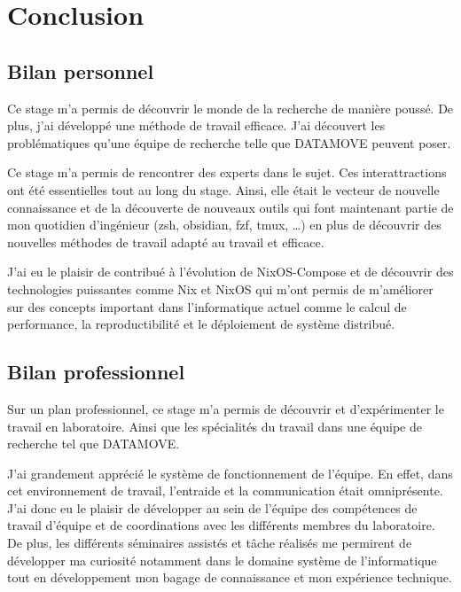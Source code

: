 \documentclass[a4paper,french,12pt, titlepage]{article}
\begin{document}
\newpage

\hypertarget{conclusion}{%
\section{Conclusion}\label{conclusion}}

\hypertarget{bilan-personnel}{%
\subsection{Bilan personnel}\label{bilan-personnel}}

Ce stage m'a permis de découvrir le monde de la recherche de manière
poussé. De plus, j'ai développé une méthode de travail efficace. J'ai
découvert les problématiques qu'une équipe de recherche telle que
DATAMOVE peuvent poser.

Ce stage m'a permis de rencontrer des experts dans le sujet. Ces
interattractions ont été essentielles tout au long du stage. Ainsi, elle
était le vecteur de nouvelle connaissance et de la découverte de
nouveaux outils qui font maintenant partie de mon quotidien d'ingénieur
(zsh, obsidian, fzf, tmux, \ldots) en plus de découvrir des nouvelles
méthodes de travail adapté au travail et efficace.

J'ai eu le plaisir de contribué à l'évolution de NixOS-Compose et de
découvrir des technologies puissantes comme Nix et NixOS qui m'ont
permis de m'améliorer sur des concepts important dans l'informatique
actuel comme le calcul de performance, la reproductibilité et le
déploiement de système distribué.\newline

\hypertarget{bilan-professionnel}{%
\subsection{Bilan professionnel}\label{bilan-professionnel}}

Sur un plan professionnel, ce stage m'a permis de découvrir et
d'expérimenter le travail en laboratoire. Ainsi que les spécialités du
travail dans une équipe de recherche tel que DATAMOVE.

J'ai grandement apprécié le système de fonctionnement de l'équipe. En
effet, dans cet environnement de travail, l'entraide et la communication
était omniprésente. J'ai donc eu le plaisir de développer au sein de
l'équipe des compétences de travail d'équipe et de coordinations avec
les différents membres du laboratoire. De plus, les différents
séminaires assistés et tâche réalisés me permirent de développer ma
curiosité notamment dans le domaine système de l'informatique tout en
développement mon bagage de connaissance et mon expérience technique.
\end{document}
